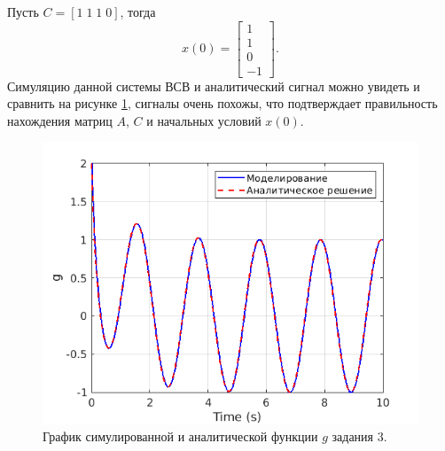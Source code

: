 Пусть $C=[1\; 1\; 1\; 0]$, тогда
\begin{equation*}
    x(0)=\begin{bmatrix}
        1\\1\\0\\-1
    \end{bmatrix}.
\end{equation*}
Симуляцию данной системы ВСВ и аналитический сигнал можно увидеть и сравнить
на рисунке \ref{fig:task_3_out}, сигналы очень похожы, что подтверждает
правильность нахождения матриц $A$, $C$ и начальных условий $x(0)$.

\begin{figure}
    \centering
    \includegraphics[width=1\textwidth]{figs/task_3_out.png}
    \caption{График симулированной и аналитической функции $g$ задания 3.}
    \label{fig:task_3_out}
\end{figure}

\newpage


